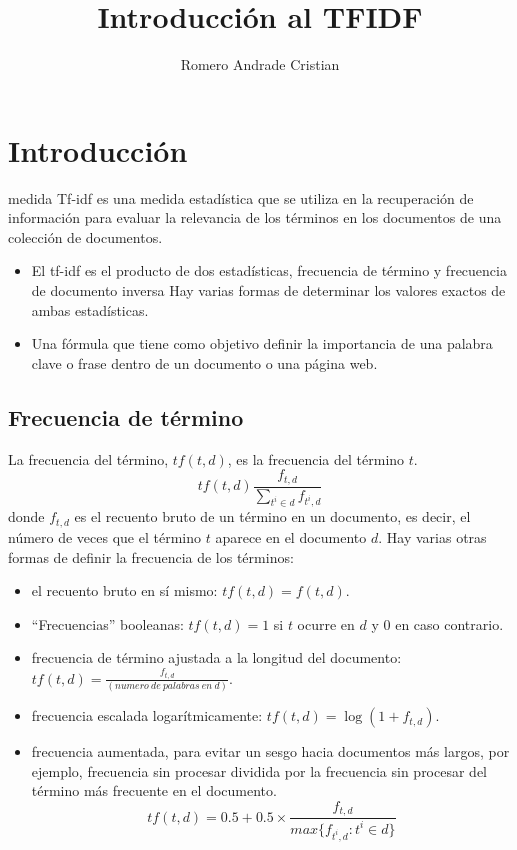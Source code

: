 \documentclass{IEEEtran}
\begin{document}
\title{Introducción al TFIDF}
\author{Romero Andrade Cristian}
\maketitle{}
\tableofcontents{}

\section{Introducción}\label{sec:introduccion}
 medida Tf-idf  es una medida estadística que se utiliza
en la recuperación de información para evaluar la relevancia de los términos en
los documentos de una colección de documentos.

\begin{itemize}
  \item El tf-idf es el producto de dos estadísticas, frecuencia de término y frecuencia de documento inversa
        Hay varias formas de determinar los valores exactos de ambas estadísticas.
  \item Una fórmula que tiene como objetivo definir la importancia de una palabra clave o frase dentro de un documento o una página web.
\end{itemize}

\subsection{Frecuencia de término}\label{sec:frec-de-term}
La frecuencia del término, $tf(t, d)$, es la frecuencia del término $t$.
\[ tf(t,d)\frac{f_{t,d}}{\sum_{t^{i}\in d}f_{t^{i}, d}}\]
donde $f_{t, d}$ es el recuento bruto de un término en un documento, es decir,
el número de veces que el término $t$ aparece en el documento $d$.
Hay varias otras formas de definir la frecuencia de los términos:
\begin{itemize}
  \item el recuento bruto en sí mismo: $tf(t, d) = f(t, d)$.
  \item ``Frecuencias'' booleanas: $tf(t, d ) = 1$ si $t$ ocurre en $d$ y $0$ en caso
        contrario.
  \item frecuencia de término ajustada a la longitud del documento:
        $tf(t, d) = \frac{f_{t, d}}{(numero\ de\ palabras\ en\ d)}$.
  \item frecuencia escalada logarítmicamente: $tf(t, d) = \log{(1 + f_{ t , d})}$.
  \item frecuencia aumentada, para evitar un sesgo hacia documentos más largos,
        por ejemplo, frecuencia sin procesar dividida por la frecuencia sin
        procesar del término más frecuente en el documento.
        \[ tf(t,d)=0.5+0.5 \times \frac{f_{t, d}}{max\{f_{t^{i}, d}: t^{i} \in d\}} \]
\end{itemize}
\end{document}
